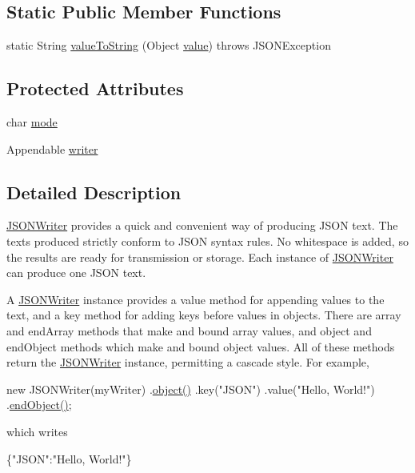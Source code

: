 \subsection*{Static Public Member Functions}
\begin{DoxyCompactItemize}
\item 
static String \hyperlink{classorg_1_1json_1_1JSONWriter_a3ec280a7de9c6827aa74209771fc0f7e}{value\-To\-String} (Object \hyperlink{classorg_1_1json_1_1JSONWriter_a29441174afee5fde940c973d20e056a9}{value})  throws J\-S\-O\-N\-Exception 
\end{DoxyCompactItemize}
\subsection*{Protected Attributes}
\begin{DoxyCompactItemize}
\item 
char \hyperlink{classorg_1_1json_1_1JSONWriter_acabe6b245b148eabfaa3cf975f98073f}{mode}
\item 
Appendable \hyperlink{classorg_1_1json_1_1JSONWriter_aa90b49b9c27c56b9d9c72186517b83c6}{writer}
\end{DoxyCompactItemize}


\subsection{Detailed Description}
\hyperlink{classorg_1_1json_1_1JSONWriter}{J\-S\-O\-N\-Writer} provides a quick and convenient way of producing J\-S\-O\-N text. The texts produced strictly conform to J\-S\-O\-N syntax rules. No whitespace is added, so the results are ready for transmission or storage. Each instance of \hyperlink{classorg_1_1json_1_1JSONWriter}{J\-S\-O\-N\-Writer} can produce one J\-S\-O\-N text. 

A \hyperlink{classorg_1_1json_1_1JSONWriter}{J\-S\-O\-N\-Writer} instance provides a {\ttfamily value} method for appending values to the text, and a {\ttfamily key} method for adding keys before values in objects. There are {\ttfamily array} and {\ttfamily end\-Array} methods that make and bound array values, and {\ttfamily object} and {\ttfamily end\-Object} methods which make and bound object values. All of these methods return the \hyperlink{classorg_1_1json_1_1JSONWriter}{J\-S\-O\-N\-Writer} instance, permitting a cascade style. For example, 
\begin{DoxyPre}
new JSONWriter(myWriter)
    .\hyperlink{classorg_1_1json_1_1JSONWriter_a50ed212b9c8c9f6a57c3ddfc6bf3126a}{object()}
        .key("JSON")
        .value("Hello, World!")
    .\hyperlink{classorg_1_1json_1_1JSONWriter_a25cc931ef86998c61f08b1d5eff22146}{endObject()};\end{DoxyPre}
 which writes 
\begin{DoxyPre}
\{"JSON":"Hello, World!"\}\end{DoxyPre}
 

